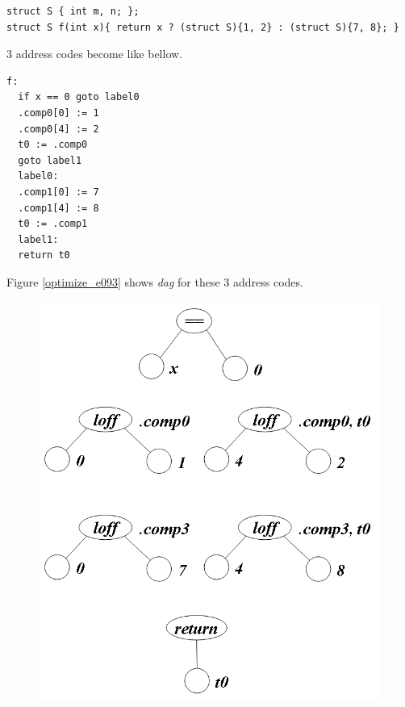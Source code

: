 \begin{Example}
\begin{verbatim}
struct S { int m, n; };
struct S f(int x){ return x ? (struct S){1, 2} : (struct S){7, 8}; }
\end{verbatim}
3 address codes become like bellow.
\begin{verbatim}
f:
  if x == 0 goto label0
  .comp0[0] := 1
  .comp0[4] := 2
  t0 := .comp0
  goto label1
  label0:
  .comp1[0] := 7
  .comp1[4] := 8
  t0 := .comp1
  label1:
  return t0
\end{verbatim}
Figure \ref{optimize_e093} shows {\em dag} for these 3 address codes.
\begin{figure}[htbp]
\begin{center}
\begin{htmlonly}
\includegraphics[width=0.857\linewidth,height=1.0\linewidth]{opt040.png}
\end{htmlonly}
\begin{latexonly}

\end{latexonly}
\end{center}
\end{figure}
\end{Example}
